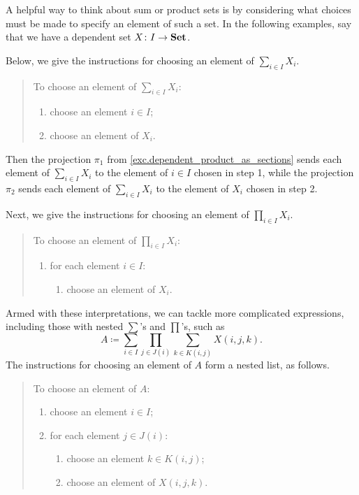 \documentclass[Book-Poly]{subfiles}
\begin{document}
A helpful way to think about sum or product sets is by considering what choices must be made to specify an element of such a set.
In the following examples, say that we have a dependent set $X \colon I \to \mathbf{Set}$.

Below, we give the instructions for choosing an element of $\sum_{i \in I} X_i$.

\begin{quote}
To choose an element of $\sum_{i \in I} X_i$: 
\begin{enumerate}
    \item choose an element $i \in I$;
    \item choose an element of $X_i$.
\end{enumerate}
\end{quote}

Then the projection $\pi_1$ from \cref{exc.dependent_product_as_sections} sends each element of $\sum_{i \in I} X_i$ to the element of $i \in I$ chosen in step 1, while the projection $\pi_2$ sends each element of $\sum_{i \in I} X_i$ to the element of $X_i$ chosen in step 2.

Next, we give the instructions for choosing an element of $\prod_{i \in I} X_i$.

\begin{quote}
To choose an element of $\prod_{i \in I} X_i$: 
\begin{enumerate}
    \item for each element $i \in I$:
    \begin{enumerate}[label*=\arabic*.]
        \item choose an element of $X_i$.
    \end{enumerate}
\end{enumerate}
\end{quote}

Armed with these interpretations, we can tackle more complicated expressions, including those with nested $\sum$'s and $\prod$'s, such as
\begin{equation}\label{eqn.misc98339}
A \coloneqq \sum_{i\in I}\prod_{j\in J(i)}\sum_{k\in K(i,j)}X(i,j,k).
\end{equation}
The instructions for choosing an element of $A$ form a nested list, as follows.

\begin{quote}
To choose an element of $A$:
\begin{enumerate}
    \item choose an element $i \in I$;
    \item for each element $j \in J(i)$:
    \begin{enumerate}[label*=\arabic*.]
        \item choose an element $k \in K(i,j)$;
        \item choose an element of $X(i,j,k)$.
    \end{enumerate}
\end{enumerate}
\end{quote}
\end{document}
